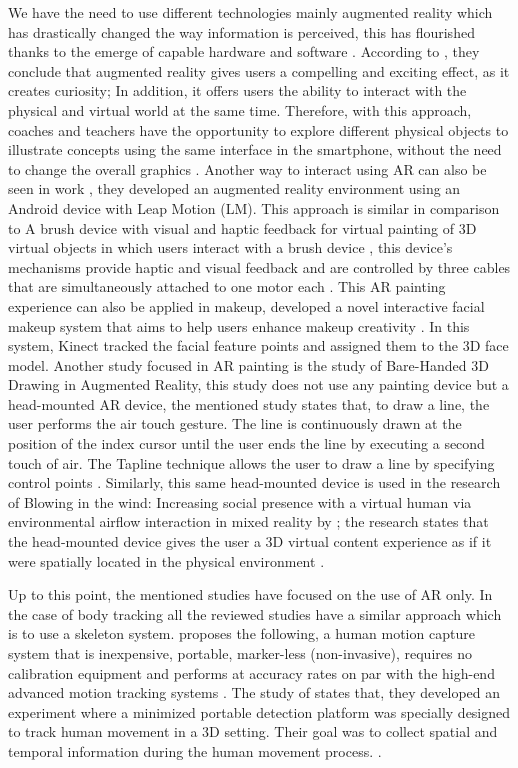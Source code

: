 \documentclass[twocolumn]{article}
\begin{document}
We have the need to use different technologies mainly augmented   reality which has 
drastically changed the way information is perceived, this has flourished thanks to the emerge 
of capable hardware and software \cite{UtilizingA}. According to \citeauthor{Anovelinte}, they 
conclude that augmented reality gives users a compelling and exciting effect, as it creates 
curiosity; In addition, it offers users the ability to interact with the physical and virtual
world at the same time. Therefore, with this approach, coaches and teachers have the 
opportunity to explore different physical objects to illustrate concepts using the same 
interface in the smartphone, without the need to change the overall graphics 
\cite{Anovelinte}. Another way to interact using AR can also be seen in \textcite{LeapMotion}
work , they developed an augmented reality environment using an Android device with Leap 
Motion (LM). This approach is similar in comparison to A brush device with visual and haptic 
feedback for virtual painting of 3D virtual objects in which users interact with a brush 
device \citeauthor{Abrushdevi}, this device’s mechanisms provide haptic and visual feedback 
and are controlled by three cables that are simultaneously attached to one motor each 
\cite{Abrushdevi}. This AR painting experience can also be applied in makeup, 
\citeauthor{MakeupCrea} developed a novel interactive facial makeup system that aims to help 
users enhance makeup creativity \cite{MakeupCrea}. In this system, Kinect tracked the facial 
feature points and assigned them to the 3D face model. Another study focused in AR painting 
is the study of \citeauthor{Bare-Hande} Bare-Handed 3D Drawing in Augmented Reality, this study 
does not use any painting device but a head-mounted AR device, the mentioned study states 
that, to draw a line, the user performs the air touch gesture. The line is continuously drawn
at the position of the index cursor until the user ends the line by executing a second touch 
of air. The Tapline technique allows the user to draw a line by specifying control points 
\cite{Bare-Hande}. Similarly, this same head-mounted device is used in the research of Blowing 
in the wind: Increasing social presence with a virtual human via environmental airflow 
interaction in mixed reality by \citeauthor{Blowingint}; the research states that the 
head-mounted device gives the user a 3D virtual content experience as if it were spatially 
located in the physical environment \cite{Blowingint}.
\bigskip


Up to this point, the mentioned studies have focused on the use of AR only. In the case of 
body tracking all the reviewed studies have a similar approach which is to use a skeleton 
system. \citeauthor{3Dmotionca} proposes the following, a human motion capture system that is
inexpensive, portable, marker-less (non-invasive), requires no calibration equipment and 
performs at accuracy rates on par with the high-end advanced motion tracking systems 
\cite{3Dmotionca}. The study of \citeauthor{TowardsHum} states that, they developed an 
experiment where a minimized portable detection platform was specially designed to track 
human movement in a 3D setting. Their goal was to collect spatial and temporal information 
during the human movement process. \cite{TowardsHum}.


\newpage


\printbibliography
\end{document}
